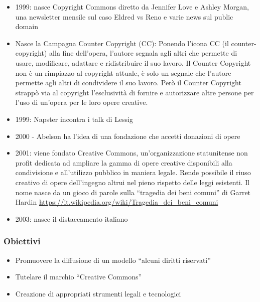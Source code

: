 \begin{itemize}
\item 1999: nasce Copyright Commons diretto da Jennifer Love e Ashley Morgan, una newsletter mensile sul caso Eldred vs Reno e varie news sul public domain

\item Nasce la Campagna Counter Copyright (CC): Ponendo l'icona CC (il counter-copyright) alla fine dell'opera, l'autore segnala agli altri che permette di usare, modificare, adattare e ridistribuire il suo lavoro. Il Counter Copyright non è un rimpiazzo al copyright attuale, è solo un segnale che l'autore permette agli altri di condividere il suo lavoro. 
Però il Counter Copyright strappò via al copyright l'esclusività di fornire e autorizzare altre persone per l'uso di un'opera per le loro opere creative.

\item 1999: Napster incontra i talk di Lessig

\item 2000 - Abelson ha l'idea di  una fondazione che accetti donazioni di opere

\item 2001: viene fondato Creative Commons, un'organizzazione statunitense non profit dedicata ad ampliare la gamma di opere creative disponibili alla condivisione e all'utilizzo pubblico in maniera legale. Rende possibile il riuso creativo di opere dell'ingegno altrui nel pieno rispetto delle leggi esistenti.
Il nome nasce da un gioco di parole sulla “tragedia dei beni comuni”
di Garret Hardin \url{https://it.wikipedia.org/wiki/Tragedia_dei_beni_comuni}

\item 2003: nasce il distaccamento italiano
\end{itemize}

\subsubsection{Obiettivi}
\begin{itemize}
\item Promuovere la diffusione di un modello “alcuni diritti riservati”

\item Tutelare il marchio “Creative Commons”

\item Creazione di appropriati strumenti legali e tecnologici
\end{itemize}

